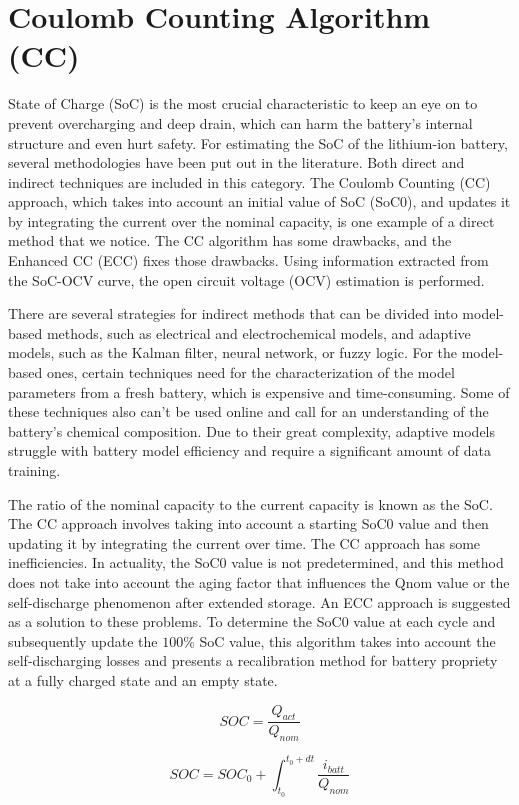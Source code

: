 \section{Coulomb Counting Algorithm (CC)}

State of Charge (SoC) is the most crucial characteristic to keep an eye on to prevent overcharging and deep drain, which can harm the battery's internal structure and even hurt safety.
For estimating the SoC of the lithium-ion battery, several methodologies have been put out in the literature. Both direct and indirect techniques are included in this category. The Coulomb Counting (CC) approach, which takes into account an initial value of SoC (SoC0), and updates it by integrating the current over the nominal capacity, is one example of a direct method that we notice. The CC algorithm has some drawbacks, and the Enhanced CC (ECC) fixes those drawbacks. Using information extracted from the SoC-OCV curve, the open circuit voltage (OCV) estimation is performed.

There are several strategies for indirect methods that can be divided into model-based methods, such as electrical and electrochemical models, and adaptive models, such as the Kalman filter, neural network, or fuzzy logic.
For the model-based ones, certain techniques need for the characterization of the model parameters from a fresh battery, which is expensive and time-consuming. Some of these techniques also can't be used online and call for an understanding of the battery's chemical composition. Due to their great complexity, adaptive models struggle with battery model efficiency and require a significant amount of data training.

The ratio of the nominal capacity to the current capacity is known as the SoC. The CC approach involves taking into account a starting SoC0 value and then updating it by integrating the current over time.
The CC approach has some inefficiencies. In actuality, the SoC0 value is not predetermined, and this method does not take into account the aging factor that influences the Qnom value or the self-discharge phenomenon after extended storage. An ECC approach is suggested as a solution to these problems.
To determine the SoC0 value at each cycle and subsequently update the $100\%$ SoC value, this algorithm takes into account the self-discharging losses and presents a recalibration method for battery propriety at a fully charged state and an empty state.

\begin{equation}\label{eq:batt_SOC_def}
    SOC = \frac{Q_{act}}{Q_{nom}}
\end{equation}

\begin{equation}\label{eq:batt_SOC_CC}
    SOC = SOC_0 + \int_{t_0}^{t_0 + dt} \frac{i_{batt}}{Q_{nom}} 
\end{equation}
